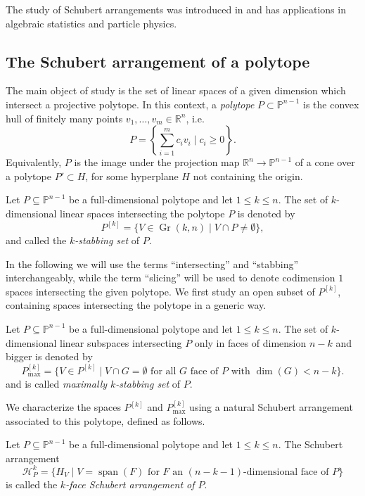 \documentclass[english]{ourlematema}
\DeclareMathOperator{\Gr}{Gr}
\DeclareMathOperator{\spanv}{span}
\newcommand{\RR}{\mathbb{R}}
\newcommand{\PP}{\mathbb{P}}
\newcommand{\Pk}{P^{[k]}}
\newcommand{\Pkmax}{P^{[k]}_{\max}}
\newcommand{\HPk}{\mathcal{H}_P^k}
\begin{document}
The study of Schubert arrangements was introduced in \cite{Schubertarr} and has applications in algebraic statistics and particle physics.

\subsection{The Schubert arrangement of a polytope}

The main object of study is the set of linear spaces of a given dimension which intersect a projective polytope. In this context, a {\em polytope} $P\subset \PP^{n-1}$ is the convex hull of finitely many points $v_1,\ldots,v_m \in \RR^n$, i.e.
\[ P = \left\{ \sum_{i=1}^m c_i v_i \mid c_i \geq 0 \right\}. \]
Equivalently, $P$ is the image under the projection map $\RR^n \to \PP^{n-1}$ of a cone over a polytope $P'\subset H$, for some hyperplane $H$ not containing the origin.

\begin{dfn}
    Let $P\subseteq \PP^{n-1}$ be a full-dimensional polytope and let $1 \leq k\leq n$. The set of $k$-dimensional linear spaces intersecting the polytope $P$ is denoted by
    \[ P^{[k]} = \{ V\in \Gr(k,n) \mid V\cap P \neq \emptyset \}, \]
    and called the \emph{$k$-stabbing set} of $P$.
\end{dfn}

In the following we will use the terms ``intersecting'' and ``stabbing'' interchangeably, while the term ``slicing'' will be used to denote codimension $1$ spaces intersecting the given polytope. We first study an open subset of $\Pk$, containing spaces intersecting the polytope in a generic way.

\begin{dfn}
    Let $P\subseteq \PP^{n-1}$ be a full-dimensional polytope and let $1 \leq k\leq n$. The set of $k$-dimensional linear subspaces intersecting $P$ only in faces of dimension $n-k$ and bigger is denoted by
    \[ \Pkmax = \{ V\in \Pk \mid V\cap G = \emptyset \text{ for all } G \text{ face of } P \text{ with } \dim(G)<n-k\}. \]
    and is called \emph{maximally $k$-stabbing set} of $P$.
\end{dfn}

We characterize the spaces $\Pk$ and $\Pkmax$ using a natural Schubert arrangement associated to this polytope, defined as follows.

\begin{dfn}
    Let $P\subseteq \PP^{n-1}$ be a full-dimensional polytope and let $1 \leq k\leq n$. The Schubert arrangement 
    \[ \HPk = \{ H_V \mid V=\spanv(F) \text{ for } F \text{ an } (n-k-1)\text{-dimensional face of } P \} \]
    is called the {\em $k$-face Schubert arrangement of $P$}. 
\end{dfn}
\end{document}
